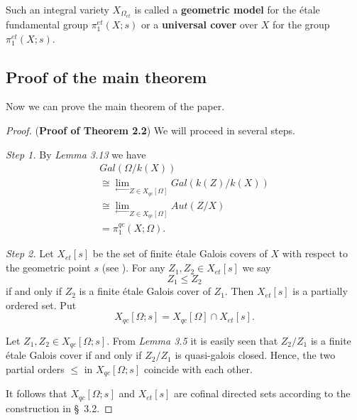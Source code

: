 \documentclass[12pt,twoside,reqno]{amsart}
\theoremstyle{definition}
\numberwithin{equation}{section}
\begin{document}
Such an integral variety $X_{\Omega _{et}}$ is called a \textbf{geometric
model} for the \'{e}tale fundamental group $\pi _{1}^{et}\left( X;s\right) $ or
a \textbf{universal cover} over $X$ for the group $\pi _{1}^{et}\left(
X;s\right) $.

\subsection{Proof of the main theorem}

Now we can prove the main theorem of the paper.

\begin{proof}
(\textbf{Proof of Theorem 2.2}) We will proceed in several steps.

\emph{Step 1.} By \emph{Lemma 3.13} we have
\begin{equation*}
\begin{array}{l}
Gal\left( \Omega /k\left( X\right) \right)\\

 \cong {\lim_{\longleftarrow }}_{Z\in X_{qc}\left[ \Omega \right] }{Gal\left( k\left( Z\right) /k\left(
X\right) \right) }\\

\cong {\lim_{\longleftarrow }}_{Z\in X_{qc}\left[ \Omega \right] }{Aut\left( Z/X\right) }\\

={\pi }_{1}^{qc}\left( X;\Omega \right) .
\end{array}
\end{equation*}

\emph{Step 2.} Let $X_{et}\left[ s\right] $ be the set of finite \'{e}tale
Galois covers of $X$ with respect to the geometric point $s$ (see ). For any $Z_{1},Z_{2}\in X_{et}\left[ s\right] $ we say $$Z_{1}\leq Z_{2}$$ if and only
if $Z_{2}$ is a finite \'{e}tale Galois cover of $Z_{1}.$ Then $X_{et}\left[ s\right] $ is a partially ordered set. Put
$$X_{qc}\left[ \Omega ;s\right] =X_{qc}\left[ \Omega \right] \cap X_{et}\left[ s\right] .$$

Let $Z_{1},Z_{2}\in X_{qc}\left[ \Omega ;s\right] .$ From \emph{Lemma 3.5}
it is easily seen that $Z_{2}/Z_{1}$ is a finite \'{e}tale Galois cover if and
only if $Z_{2}/Z_{1}$ is quasi-galois closed. Hence, the two partial orders $\leq $ in $X_{qc}\left[ \Omega ;s\right] $ coincide with each other.

It follows that $X_{qc}\left[ \Omega ;s\right] $ and $X_{et}\left[ s\right] $ are cofinal directed sets according to the construction in \S\ 3.2.


\end{proof}
\end{document}
